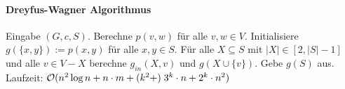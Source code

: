 \paragraph{Dreyfus-Wagner Algorithmus}
Eingabe $(G, c, S)$.
Berechne $p(v, w)$ für alle $v,w \in V$.
Initialisiere $g(\{x,y\}) := p(x,y)$ für alle $x,y \in S$.
Für alle $X \subseteq S$ mit $|X| \in [2, |S|-1]$ und alle $v \in V-X$ berechne $g_{in}(X, v)$ und $g(X \cup \{v\})$.
Gebe $g(S)$ aus.
\\
Laufzeit: $\mathcal{O} (n^2 \log n + n \cdot m + (k^2 + )\; 3^k \cdot n + 2^k \cdot n^2)$




